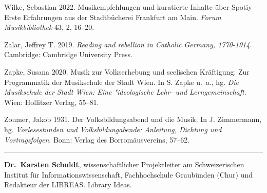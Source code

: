 \documentclass[a4paper,
fontsize=11pt,
oneside,
numbers=noperiodatend,
parskip=half-,
bibliography=totoc,
final
]{scrartcl}
\begin{document}
Wilke, Sebastian 2022. Musikempfehlungen und kuratierte Inhalte über
Spotiy - Erste Erfahrungen aus der Stadtbücherei Frankfurt am Main.
\emph{Forum Musikbibliothek} 43, 2, 16--20.

Zalar, Jeffrey T. 2019. \emph{Reading and rebellion in Catholic Germany,
1770-1914}. Cambridge: Cambridge University Press.

Zapke, Susana 2020. Musik zur Volkserhebung und seelischen Kräftigung:
Zur Programmatik der Musikschule der Stadt Wien. In S. Zapke u.~a., hg.
\emph{Die Musikschule der Stadt Wien: Eine "ideologische Lehr- und
Lerngemeinschaft}. Wien: Hollitzer Verlag, 55--81.

Zoumer, Jakob 1931. Der Volksbildungsabend und die Musik. In J.
Zimmermann, hg. \emph{Vorlesestunden und Volksbildungabende: Anleitung,
Dichtung und Vortragsfolgen}. Bonn: Verlag des Borromäusvereins, 57--62.

\begin{center}\rule{0.5\linewidth}{0.5pt}\end{center}

\textbf{Dr.~Karsten Schuldt}, wissenschaftlicher Projektleiter am
Schweizerischen Institut für Informationswissenschaft, Fachhochschule
Graubünden (Chur) und Redakteur der LIBREAS. Library Ideas.
\end{document}
